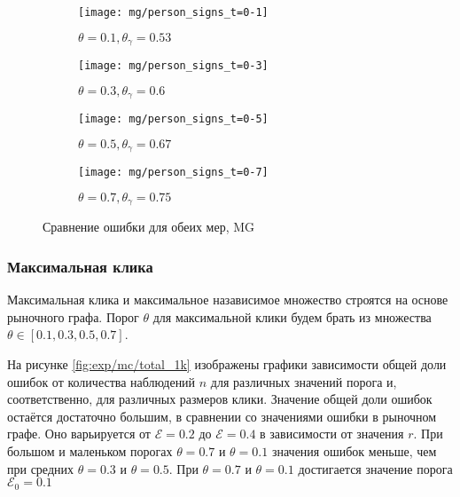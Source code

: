 \begin{figure}[H]
     \centering
     \begin{subfigure}[b]{0.49\textwidth}
         \centering
         \texttt{[image: mg/person\_signs\_t=0-1]}
         \caption{$\theta=0.1, \theta_\gamma=0.53$}
     \end{subfigure}
     \hfill
     \begin{subfigure}[b]{0.49\textwidth}
         \centering
         \texttt{[image: mg/person\_signs\_t=0-3]}
         \caption{$\theta=0.3, \theta_\gamma=0.6$}
     \end{subfigure}
     \vfill
     \begin{subfigure}[b]{0.49\textwidth}
         \centering
         \texttt{[image: mg/person\_signs\_t=0-5]}
         \caption{$\theta=0.5, \theta_\gamma=0.67$}
     \end{subfigure}
     \hfill
     \begin{subfigure}[b]{0.49\textwidth}
         \centering
         \texttt{[image: mg/person\_signs\_t=0-7]}
         \caption{$\theta=0.7,\theta_\gamma=0.75$}
     \end{subfigure}
     

        \caption{Сравнение ошибки для обеих мер, MG}
        \label{fig:exp/mg/pearson_signs}
\end{figure}  


\subsubsection{Максимальная клика}
Максимальная клика и максимальное назависимое множество строятся на основе рыночного графа.  Порог $\theta$ для максимальной клики будем брать из множества $\theta \in [0.1, 0.3, 0.5, 0.7]$.

На рисунке \ref{fig:exp/mc/total_1k} изображены графики зависимости общей доли ошибок от количества наблюдений $n$ для различных значений порога и, соответственно, для различных размеров клики.  Значение  общей доли ошибок остаётся достаточно большим, в сравнении со значениями ошибки в рыночном графе. Оно варьируется от $\mathcal{E}=0.2$ до  $\mathcal{E}=0.4$ в зависимости от значения $r$. При большом и маленьком порогах $\theta=0.7$ и $\theta=0.1$ значения ошибок меньше, чем при средних $\theta=0.3$ и $\theta=0.5$. При $\theta=0.7$ и $\theta=0.1$ достигается значение порога $\mathcal{E}_0=0.1$



